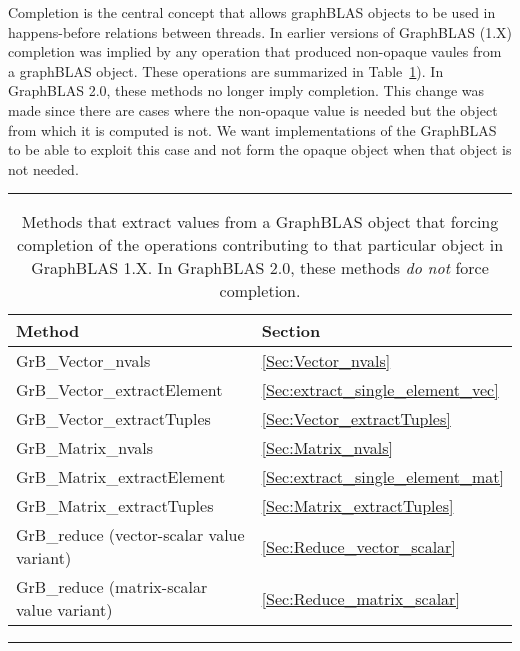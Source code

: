 Completion is the central concept that allows graphBLAS objects to be used in happens-before
relations between threads.  In earlier versions of GraphBLAS (1.X) completion was implied
by any operation that produced non-opaque vaules from a graphBLAS object.  These 
operations are summarized in  Table~\ref{Tab:ExtractMethods}).  In GraphBLAS 2.0, these 
methods no longer imply completion.  This change was made since there are cases where 
the non-opaque value is needed but the object from which it is computed is not. We
want implementations of the GraphBLAS to be able to exploit this case and not form the 
opaque object when that object is not needed.  

\begin{table}[tbh]
    \hrule
    \begin{center}
        \caption{Methods that extract values from a GraphBLAS object that 
        forcing completion of the operations contributing to that particular object in GraphBLAS 1.X. 
        In GraphBLAS 2.0, these methods \emph{do not} force completion.}
        \label{Tab:ExtractMethods}

        \begin{tabular}{l|l}
            Method    					& Section 				\\ \hline

            {\sf GrB\_Vector\_nvals}        		& \ref{Sec:Vector_nvals}        	\\
            {\sf GrB\_Vector\_extractElement}     	& \ref{Sec:extract_single_element_vec}  \\
            {\sf GrB\_Vector\_extractTuples}    	& \ref{Sec:Vector_extractTuples}    	\\
            {\sf GrB\_Matrix\_nvals}        		& \ref{Sec:Matrix_nvals}        	\\
            {\sf GrB\_Matrix\_extractElement}     	& \ref{Sec:extract_single_element_mat}  \\
            {\sf GrB\_Matrix\_extractTuples}    	& \ref{Sec:Matrix_extractTuples}    	\\
            {\sf GrB\_reduce} (vector-scalar value variant)   & \ref{Sec:Reduce_vector_scalar}        \\
            {\sf GrB\_reduce} (matrix-scalar value variant)   & \ref{Sec:Reduce_matrix_scalar}        \\
        \end{tabular}
    \end{center}
    \hrule
\end{table}




